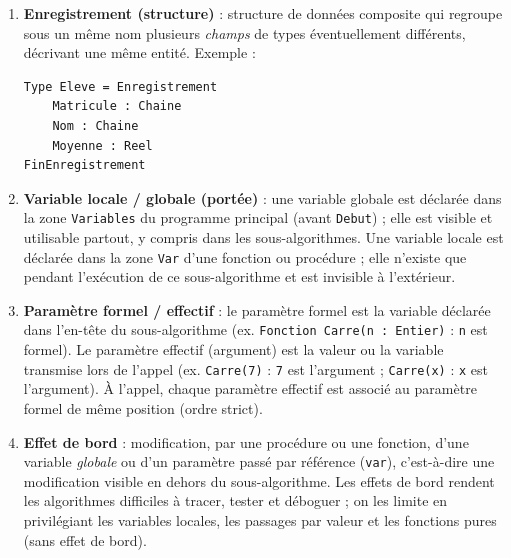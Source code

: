 \documentclass[11pt]{article}
\newcommand{\cle}[1]{{\popxbold\color{popdark}#1}}
\begin{document}
\begin{corrige}
\begin{enumerate}
    \item \textbf{Enregistrement (structure)} : structure de données composite qui regroupe sous un même nom plusieurs \emph{champs} de types éventuellement différents, décrivant une même entité. Exemple :
\begin{lstlisting}
Type Eleve = Enregistrement
    Matricule : Chaine
    Nom : Chaine
    Moyenne : Reel
FinEnregistrement
\end{lstlisting}
    \item \textbf{Variable locale / globale (portée)} : une variable \cle{globale} est déclarée dans la zone \texttt{Variables} du programme principal (avant \texttt{Debut}) ; elle est visible et utilisable partout, y compris dans les sous-algorithmes. Une variable \cle{locale} est déclarée dans la zone \texttt{Var} d'une fonction ou procédure ; elle n'existe que pendant l'exécution de ce sous-algorithme et est invisible à l'extérieur.
    \item \textbf{Paramètre formel / effectif} : le \cle{paramètre formel} est la variable déclarée dans l'en-tête du sous-algorithme (ex. \texttt{Fonction Carre(n : Entier)} : \texttt{n} est formel). Le \cle{paramètre effectif} (argument) est la valeur ou la variable transmise lors de l'appel (ex. \texttt{Carre(7)} : \texttt{7} est l'argument ; \texttt{Carre(x)} : \texttt{x} est l'argument). À l'appel, chaque paramètre effectif est associé au paramètre formel de même position (ordre strict).
    \item \textbf{Effet de bord} : modification, par une procédure ou une fonction, d'une variable \emph{globale} ou d'un paramètre passé par référence (\texttt{var}), c'est-à-dire une modification visible en dehors du sous-algorithme. Les effets de bord rendent les algorithmes difficiles à tracer, tester et déboguer ; on les limite en privilégiant les variables locales, les passages par valeur et les fonctions pures (sans effet de bord).
\end{enumerate}
\end{corrige}
\end{document}
